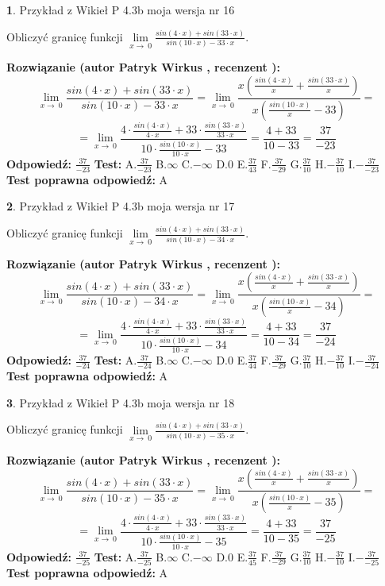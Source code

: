 \documentclass[12pt, a4paper]{article}
\theoremstyle{definition} %
\newtheorem{zad}{}
\newcommand{\zadStart}[1]{\begin{zad}#1\newline}
\newcommand{\zadStop}{\end{zad}}
\newcommand{\rozwStart}[2]{\noindent \textbf{Rozwiązanie (autor #1 , recenzent #2): }\newline}
\newcommand{\rozwStop}{\newline}
\newcommand{\odpStart}{\noindent \textbf{Odpowiedź:}\newline}
\newcommand{\odpStop}{\newline}
\newcommand{\testStart}{\noindent \textbf{Test:}\newline}
\newcommand{\testStop}{\newline}
\newcommand{\kluczStart}{\noindent \textbf{Test poprawna odpowiedź:}\newline}
\newcommand{\kluczStop}{\newline}
\begin{document}
\zadStart{Przykład z Wikieł P 4.3b moja wersja nr 16}


Obliczyć granicę funkcji $\lim\limits_{x\to\ 0}\frac{sin(4 \cdot x)+sin(33 \cdot x)}{sin(10 \cdot x)-33 \cdot x}$.
\zadStop
\rozwStart{Patryk Wirkus}{}
$$\lim\limits_{x\to\ 0}\frac{sin(4 \cdot x)+sin(33 \cdot x)}{sin(10 \cdot x)-33 \cdot x}=\lim\limits_{x\to\ 0}\frac{x(\frac{sin(4 \cdot x)}{x}+\frac{sin(33 \cdot x)}{x})}{x(\frac{sin(10 \cdot x)}{x}-33)}=$$
$$=\lim\limits_{x\to\ 0}\frac{4 \cdot \frac{sin(4 \cdot x)}{4 \cdot x}+33 \cdot \frac{sin(33 \cdot x)}{33 \cdot x}}{10 \cdot \frac{sin(10 \cdot x)}{10 \cdot x}-33}=\frac{4+33}{10-33} = \frac{37}{-23}$$
\rozwStop
\odpStart
$\frac{37}{-23}$
\odpStop
\testStart
A.$\frac{37}{-23}$
B.$\infty$
C.$-\infty$
D.$0$
E.$\frac{37}{43}$
F.$\frac{37}{-29}$
G.$\frac{37}{10}$
H.$-\frac{37}{10}$
I.$-\frac{37}{-23}$
\testStop
\kluczStart
A
\kluczStop



\zadStart{Przykład z Wikieł P 4.3b moja wersja nr 17}


Obliczyć granicę funkcji $\lim\limits_{x\to\ 0}\frac{sin(4 \cdot x)+sin(33 \cdot x)}{sin(10 \cdot x)-34 \cdot x}$.
\zadStop
\rozwStart{Patryk Wirkus}{}
$$\lim\limits_{x\to\ 0}\frac{sin(4 \cdot x)+sin(33 \cdot x)}{sin(10 \cdot x)-34 \cdot x}=\lim\limits_{x\to\ 0}\frac{x(\frac{sin(4 \cdot x)}{x}+\frac{sin(33 \cdot x)}{x})}{x(\frac{sin(10 \cdot x)}{x}-34)}=$$
$$=\lim\limits_{x\to\ 0}\frac{4 \cdot \frac{sin(4 \cdot x)}{4 \cdot x}+33 \cdot \frac{sin(33 \cdot x)}{33 \cdot x}}{10 \cdot \frac{sin(10 \cdot x)}{10 \cdot x}-34}=\frac{4+33}{10-34} = \frac{37}{-24}$$
\rozwStop
\odpStart
$\frac{37}{-24}$
\odpStop
\testStart
A.$\frac{37}{-24}$
B.$\infty$
C.$-\infty$
D.$0$
E.$\frac{37}{44}$
F.$\frac{37}{-29}$
G.$\frac{37}{10}$
H.$-\frac{37}{10}$
I.$-\frac{37}{-24}$
\testStop
\kluczStart
A
\kluczStop



\zadStart{Przykład z Wikieł P 4.3b moja wersja nr 18}


Obliczyć granicę funkcji $\lim\limits_{x\to\ 0}\frac{sin(4 \cdot x)+sin(33 \cdot x)}{sin(10 \cdot x)-35 \cdot x}$.
\zadStop
\rozwStart{Patryk Wirkus}{}
$$\lim\limits_{x\to\ 0}\frac{sin(4 \cdot x)+sin(33 \cdot x)}{sin(10 \cdot x)-35 \cdot x}=\lim\limits_{x\to\ 0}\frac{x(\frac{sin(4 \cdot x)}{x}+\frac{sin(33 \cdot x)}{x})}{x(\frac{sin(10 \cdot x)}{x}-35)}=$$
$$=\lim\limits_{x\to\ 0}\frac{4 \cdot \frac{sin(4 \cdot x)}{4 \cdot x}+33 \cdot \frac{sin(33 \cdot x)}{33 \cdot x}}{10 \cdot \frac{sin(10 \cdot x)}{10 \cdot x}-35}=\frac{4+33}{10-35} = \frac{37}{-25}$$
\rozwStop
\odpStart
$\frac{37}{-25}$
\odpStop
\testStart
A.$\frac{37}{-25}$
B.$\infty$
C.$-\infty$
D.$0$
E.$\frac{37}{45}$
F.$\frac{37}{-29}$
G.$\frac{37}{10}$
H.$-\frac{37}{10}$
I.$-\frac{37}{-25}$
\testStop
\kluczStart
A
\kluczStop
\end{document}
